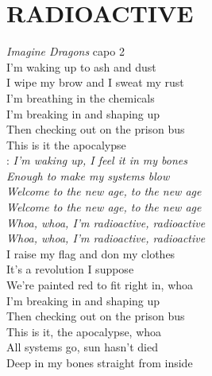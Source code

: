 \section*{\Huge RADIOACTIVE}
\emph{Imagine Dragons} \hspace{10cm} capo 2\\

I’m waking up to ash and dust\\
I wipe my brow and I sweat my rust\\
I’m breathing in the chemicals\\

I’m breaking in and shaping up\\
Then checking out on the prison bus\\
This is it the apocalypse\\

\textregistered:
\emph{I’m waking up, I feel it in my bones\\
Enough to make my systems blow\\
Welcome to the new age, to the new age\\
Welcome to the new age, to the new age\\
Whoa, whoa, I’m radioactive, radioactive\\
Whoa, whoa, I’m radioactive, radioactive}\\

I raise my flag and don my clothes\\
It’s a revolution I suppose\\
We’re painted red to fit right in, whoa\\

I’m breaking in and shaping up\\
Then checking out on the prison bus\\
This is it, the apocalypse, whoa \hspace{1cm}\textregistered\\

All systems go, sun hasn’t died\\
Deep in my bones straight from inside \hspace{1cm}\textregistered

\newpage

